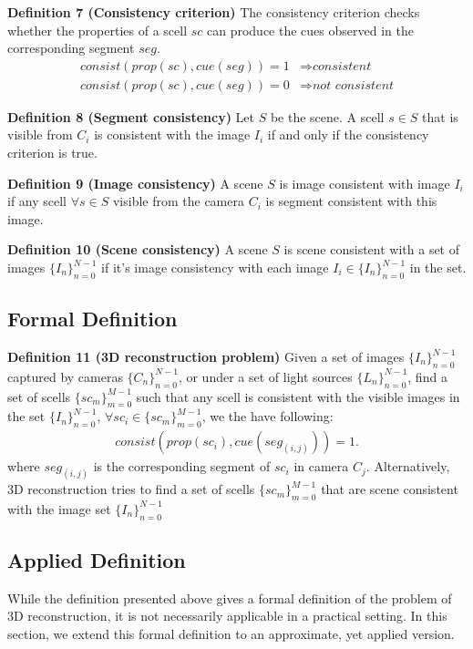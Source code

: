 \noindent\textbf{Definition 7 (Consistency criterion)} The consistency criterion checks whether the properties of a scell $sc$ can produce the cues observed in the corresponding segment $seg$.
\begin{align*}
consist(prop(sc), cue(seg)) = 1 &\Rightarrow \textit{consistent}\\
consist(prop(sc), cue(seg)) = 0 &\Rightarrow \textit{not consistent}
\end{align*}

\noindent\textbf{Definition 8 (Segment consistency)} Let $S$ be the scene. A scell $s\in S$ that is visible from $C_i$ is consistent with the image $I_i$ if and only if the consistency criterion is true.

\noindent\textbf{Definition 9 (Image consistency)} A scene $S$ is image consistent with image $I_i$ if any scell $\forall s\in S$ visible from the camera $C_i$ is segment consistent with this image.

\noindent\textbf{Definition 10 (Scene consistency)} A scene $S$ is scene consistent with a set of images $\{I_n\}_{n=0}^{N-1}$ if it's image consistency with each image $I_i\in \{I_n\}_{n=0}^{N-1}$ in the set.

\subsection{Formal Definition}
\noindent\textbf{Definition 11 (3D reconstruction problem)} Given a set of images $\{I_n\}_{n=0}^{N-1}$ captured by cameras $\{C_n\}_{n=0}^{N-1}$, or under a set of light sources $\{L_n\}_{n=0}^{N-1}$, find a set of scells $\{sc_m\}_{m=0}^{M-1}$ such that any scell is consistent with the visible images in the set $\{I_n\}_{n=0}^{N-1}$, \ie $\forall sc_i\in \{sc_m\}_{m=0}^{M-1}$, we the have following:
\begin{align*}
consist(prop(sc_i), cue(seg_{(i, j)})) = 1.
\end{align*}
where $seg_{(i, j)}$ is the corresponding segment of $sc_i$ in camera $C_j$. Alternatively, 3D reconstruction tries to find a set of scells $\{sc_m\}_{m=0}^{M-1}$ that are scene consistent with the image set $\{I_n\}_{n=0}^{N-1}$

\subsection{Applied Definition}
While the definition presented above gives a formal definition of the problem of 3D reconstruction, it is not necessarily applicable in a practical setting. In this section, we extend this formal definition to an approximate, yet applied version.


